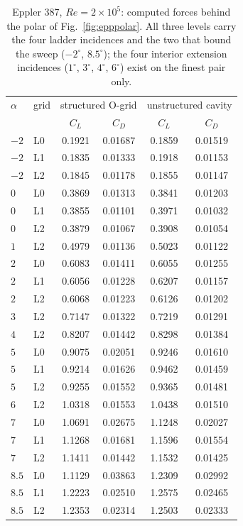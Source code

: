 \begin{table}[tp]
  \centering\small
  \caption{Eppler 387, $Re\!=\!2\!\times\!10^5$: computed forces behind the polar of Fig.~\ref{fig:epppolar}. All three levels carry the four ladder incidences and the two that bound the sweep ($-2^\circ$, $8.5^\circ$); the four interior extension incidences ($1^\circ$, $3^\circ$, $4^\circ$, $6^\circ$) exist on the finest pair only.}
  \label{tab:data_epppolar}
  \begin{tabular}{ll cc cc}
    \toprule
    $\alpha$ & grid & \multicolumn{2}{c}{structured O-grid} & \multicolumn{2}{c}{unstructured cavity} \\ & & $C_L$ & $C_D$ & $C_L$ & $C_D$ \\
    \midrule
    $-2$ & L0 & 0.1921 & 0.01687 & 0.1859 & 0.01519 \\
    $-2$ & L1 & 0.1835 & 0.01333 & 0.1918 & 0.01153 \\
    $-2$ & L2 & 0.1845 & 0.01178 & 0.1855 & 0.01147 \\
    $0$ & L0 & 0.3869 & 0.01313 & 0.3841 & 0.01203 \\
    $0$ & L1 & 0.3855 & 0.01101 & 0.3971 & 0.01032 \\
    $0$ & L2 & 0.3879 & 0.01067 & 0.3908 & 0.01054 \\
    $1$ & L2 & 0.4979 & 0.01136 & 0.5023 & 0.01122 \\
    $2$ & L0 & 0.6083 & 0.01411 & 0.6055 & 0.01255 \\
    $2$ & L1 & 0.6056 & 0.01228 & 0.6207 & 0.01157 \\
    $2$ & L2 & 0.6068 & 0.01223 & 0.6126 & 0.01202 \\
    $3$ & L2 & 0.7147 & 0.01322 & 0.7219 & 0.01291 \\
    $4$ & L2 & 0.8207 & 0.01442 & 0.8298 & 0.01384 \\
    $5$ & L0 & 0.9075 & 0.02051 & 0.9246 & 0.01610 \\
    $5$ & L1 & 0.9214 & 0.01626 & 0.9462 & 0.01459 \\
    $5$ & L2 & 0.9255 & 0.01552 & 0.9365 & 0.01481 \\
    $6$ & L2 & 1.0318 & 0.01553 & 1.0438 & 0.01510 \\
    $7$ & L0 & 1.0691 & 0.02675 & 1.1248 & 0.02027 \\
    $7$ & L1 & 1.1268 & 0.01681 & 1.1596 & 0.01554 \\
    $7$ & L2 & 1.1411 & 0.01442 & 1.1532 & 0.01425 \\
    $8.5$ & L0 & 1.1129 & 0.03863 & 1.2309 & 0.02992 \\
    $8.5$ & L1 & 1.2223 & 0.02510 & 1.2575 & 0.02465 \\
    $8.5$ & L2 & 1.2353 & 0.02314 & 1.2503 & 0.02333 \\
    \bottomrule
  \end{tabular}
\end{table}
